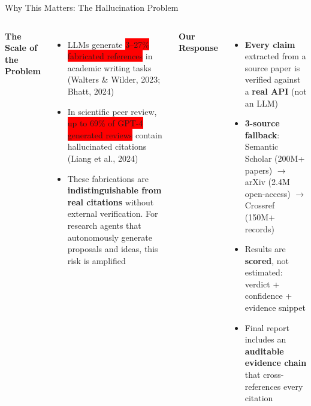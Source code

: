 \documentclass[aspectratio=169,11pt]{beamer}
\begin{document}
\begin{frame}{Why This Matters: The Hallucination Problem}
  \begin{columns}[T]
    \textbf{The Scale of the Problem}
    \begin{itemize}
      \item LLMs generate \colorbox{red}{\color{white}3--27\% fabricated references} in academic writing tasks (Walters \& Wilder, 2023; Bhatt, 2024)
      \item In scientific peer review, \colorbox{red}{\color{white}up to 69\% of GPT-4 generated reviews} contain hallucinated citations (Liang et al., 2024)
      \item These fabrications are \textbf{indistinguishable from real citations} without external verification. For research agents that autonomously generate proposals and ideas, this risk is amplified
    \end{itemize}

    \textbf{Our Response}
    \begin{itemize}
      \item \textbf{Every claim} extracted from a source paper is verified against a \textbf{real API} (not an LLM)
      \item \textbf{3-source fallback}: Semantic Scholar (200M+ papers) $\to$ arXiv (2.4M open-access) $\to$ Crossref (150M+ records)
      \item Results are \textbf{scored}, not estimated: verdict + confidence + evidence snippet
      \item Final report includes an \textbf{auditable evidence chain} that cross-references every citation
    \end{itemize}
  \end{columns}
\end{frame}
\end{document}
